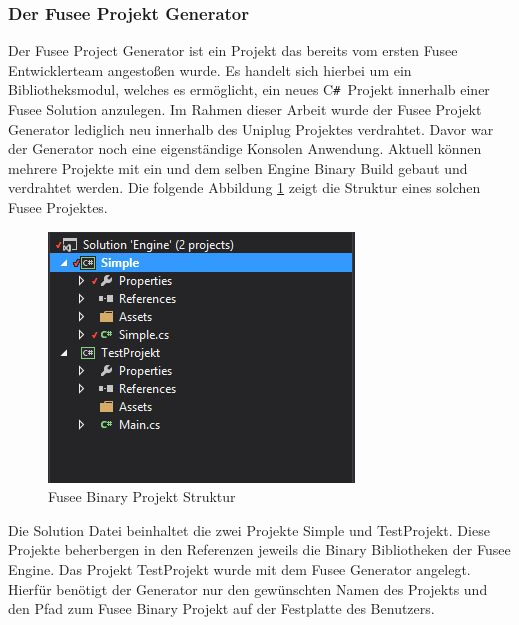 \documentclass[pagesize, paper=a4, fontsize=12pt, titlepage=true, headings=small, headnosepline, abstractoff, liststotoc, nochapterprefix, plainheadsepline, twoside]{scrreprt}
\newcommand{\CSS}{C\texttt{\# }}
\begin{document}
\subsubsection{Der Fusee Projekt Generator}
Der Fusee Project Generator ist ein Projekt das bereits vom ersten Fusee Entwicklerteam angestoßen wurde. Es  handelt sich hierbei um ein Bibliotheksmodul, welches es ermöglicht, ein neues \CSS Projekt innerhalb einer Fusee Solution anzulegen. Im Rahmen dieser Arbeit wurde der Fusee Projekt Generator lediglich neu innerhalb des Uniplug Projektes verdrahtet. Davor war der Generator noch eine eigenständige Konsolen Anwendung. Aktuell können mehrere Projekte mit ein und dem selben Engine Binary Build gebaut und verdrahtet werden. Die folgende Abbildung \ref{FuseeBinaryProjektStruktur} zeigt die Struktur eines solchen Fusee Projektes.
\begin{figure}[ht]
	\centering
	\includegraphics[width=\linewidth/2]{Bilder/FuseeBinaryProjekt.jpg}
	\caption{Fusee Binary Projekt Struktur}
	\label{FuseeBinaryProjektStruktur}
\end{figure}
Die Solution Datei beinhaltet die zwei Projekte Simple und TestProjekt. Diese Projekte beherbergen in den Referenzen jeweils die Binary Bibliotheken der Fusee Engine. Das Projekt TestProjekt wurde mit dem Fusee Generator angelegt. Hierfür benötigt der Generator nur den gewünschten Namen des Projekts und den Pfad zum Fusee Binary Projekt auf der Festplatte des Benutzers.
\end{document}
